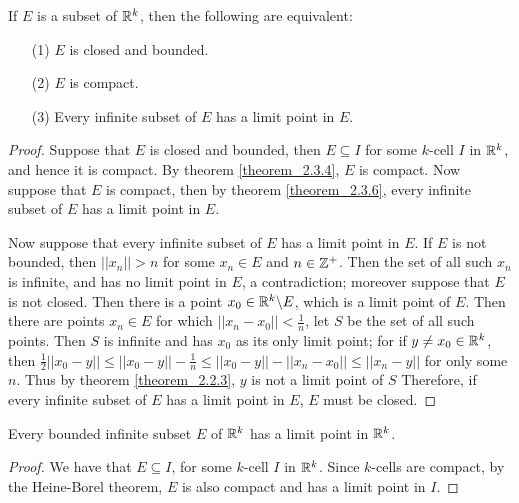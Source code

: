 \begin{theorem}\label{theorem_2.3.10}
  If $E$ is a subset of  $\mathbb{R}^k$, then the following are equivalent:
  \begin{enumerate}
    \item[(1)] $E$ is closed and bounded.

    \item[(2)] $E$ is compact.

    \item[(3)] Every infinite subset of  $E$ has a limit point in  $E$.
  \end{enumerate}
\end{theorem}
\begin{proof}
  Suppose that $E$ is closed and bounded, then  $E \subseteq I$ for some  $k$-cell
  $I$ in $\mathbb{R}^k$, and hence it is compact. By theorem \ref{theorem_2.3.4},  $E$ is
  compact. Now suppose that  $E$ is compact, then by theorem
  \ref{theorem_2.3.6}, every infinite subset of $E$ has a limit point in $E$.

  Now suppose that every infinite subset of  $E$ has a limit point in  $E$. If  $E$
  is not bounded, then  $||x_n||>n$ for some $x_n \in E$ and  $n \in \mathbb{Z}^+$. Then
  the set of all such  $x_n$ is infinite, and has no limit point in  $E$, a
  contradiction; moreover suppose that  $E$ is not closed. Then there is a point
  $x_0 \in \mathbb{R}^k \backslash E$, which is a limit point of  $E$. Then there are points
  $x_n \in E$ for which  $||x_n-x_0||<\frac{1}{n}$, let $S$ be the set of all
  such points. Then  $S$ is infinite and has  $x_0$ as its only limit point; for
  if $y \neq x_0 \in \mathbb{R}^k$, then $ \frac{1}{2}||x_0-y|| \leq ||x_0-y||-\frac{1}{n}
  \leq ||x_0-y||-||x_n-x_0|| \leq ||x_n-y||$ for only some $n$. Thus by theorem
  \ref{theorem_2.2.3}, $y$ is not a limit point of  $S$ Therefore, if every
  infinite subset of $E$ has a limit point in  $E$,  $E$ must be closed.
\end{proof}

\begin{theorem}\label{theorem_2.2.11}
  Every bounded infinite subset $E$ of  $\mathbb{R}^k$ has a limit point in  $\mathbb{R}^k$.
\end{theorem}
\begin{proof}
  We have that $E \subseteq I$, for some  $k$-cell  $I$ in $\mathbb{R}^k$. Since $k$-cells
  are compact, by the Heine-Borel theorem,  $E$ is also compact and has a limit point
  in  $I$.
\end{proof}
